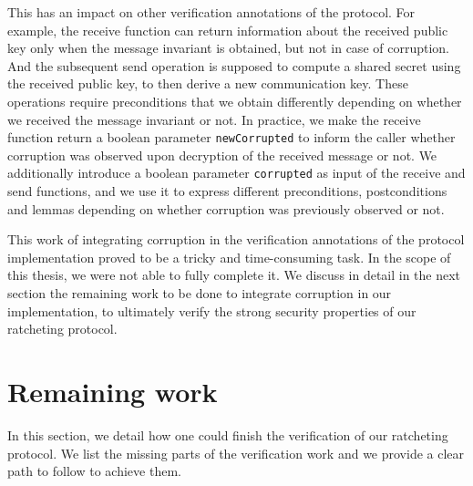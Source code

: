 This has an impact on other verification annotations of the protocol.
For example, the receive function can return information about the received public key only when the message invariant is obtained, but not in case of corruption.
And the subsequent send operation is supposed to compute a shared secret using the received public key, to then derive a new communication key.
These operations require preconditions that we obtain differently depending on whether we received the message invariant or not.
In practice, we make the receive function return a boolean parameter \texttt{newCorrupted} to inform the caller whether corruption was observed upon decryption of the received message or not.
We additionally introduce a boolean parameter \texttt{corrupted} as input of the receive and send functions, and we use it to express different preconditions, postconditions and lemmas depending on whether corruption was previously observed or not.

This work of integrating corruption in the verification annotations of the protocol implementation proved to be a tricky and time-consuming task.
In the scope of this thesis, we were not able to fully complete it.
We discuss in detail in the next section the remaining work to be done to integrate corruption in our implementation, to ultimately verify the strong security properties of our ratcheting protocol.

\section{Remaining work}
\label{sec:remaining-work}

In this section, we detail how one could finish the verification of our ratcheting protocol.
We list the missing parts of the verification work and we provide a clear path to follow to achieve them.

